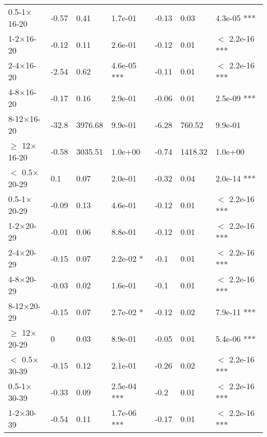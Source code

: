 \documentclass{article}\usepackage[utf8]{inputenc}
\begin{document}
\begin{longtable}[t]{lllllll}
\hspace{1em}0.5-1$\times$16-20 & -0.57 & 0.41 & 1.7e-01 & -0.13 & 0.03 & 4.3e-05 ***\\
\hspace{1em}1-2$\times$16-20 & -0.12 & 0.11 & 2.6e-01 & -0.12 & 0.01 & $<$ 2.2e-16 ***\\
\hspace{1em}2-4$\times$16-20 & -2.54 & 0.62 & 4.6e-05 *** & -0.11 & 0.01 & $<$ 2.2e-16 ***\\
\hspace{1em}4-8$\times$16-20 & -0.17 & 0.16 & 2.9e-01 & -0.06 & 0.01 & 2.5e-09 ***\\
\hspace{1em}8-12$\times$16-20 & -32.8 & 3976.68 & 9.9e-01 & -6.28 & 760.52 & 9.9e-01\\
\hspace{1em}$\geq$ 12$\times$16-20 & -0.58 & 3035.51 & 1.0e+00 & -0.74 & 1418.32 & 1.0e+00\\
\hspace{1em}$<$ 0.5$\times$20-29 & 0.1 & 0.07 & 2.0e-01 & -0.32 & 0.04 & 2.0e-14 ***\\
\hspace{1em}0.5-1$\times$20-29 & -0.09 & 0.13 & 4.6e-01 & -0.12 & 0.01 & $<$ 2.2e-16 ***\\
\hspace{1em}1-2$\times$20-29 & -0.01 & 0.06 & 8.8e-01 & -0.12 & 0.01 & $<$ 2.2e-16 ***\\
\hspace{1em}2-4$\times$20-29 & -0.15 & 0.07 & 2.2e-02 * & -0.1 & 0.01 & $<$ 2.2e-16 ***\\
\hspace{1em}4-8$\times$20-29 & -0.03 & 0.02 & 1.6e-01 & -0.1 & 0.01 & $<$ 2.2e-16 ***\\
\hspace{1em}8-12$\times$20-29 & -0.15 & 0.07 & 2.7e-02 * & -0.12 & 0.02 & 7.9e-11 ***\\
\hspace{1em}$\geq$ 12$\times$20-29 & 0 & 0.03 & 8.9e-01 & -0.05 & 0.01 & 5.4e-06 ***\\
\hspace{1em}$<$ 0.5$\times$30-39 & -0.15 & 0.12 & 2.1e-01 & -0.26 & 0.02 & $<$ 2.2e-16 ***\\
\hspace{1em}0.5-1$\times$30-39 & -0.33 & 0.09 & 2.5e-04 *** & -0.2 & 0.01 & $<$ 2.2e-16 ***\\
\hspace{1em}1-2$\times$30-39 & -0.54 & 0.11 & 1.7e-06 *** & -0.17 & 0.01 & $<$ 2.2e-16 ***\\

\end{longtable}
\end{document}
